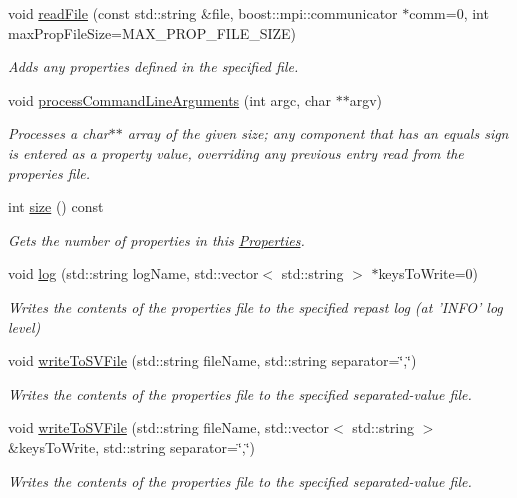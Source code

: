 \begin{DoxyCompactItemize}
void \hyperlink{classrepast_1_1_properties_a85536ec978c9077c3447bcc4a9422608}{read\-File} (const std\-::string \&file, boost\-::mpi\-::communicator $\ast$comm=0, int max\-Prop\-File\-Size=M\-A\-X\-\_\-\-P\-R\-O\-P\-\_\-\-F\-I\-L\-E\-\_\-\-S\-I\-Z\-E)
\begin{DoxyCompactList}\small\item\em Adds any properties defined in the specified file. \end{DoxyCompactList}\item 
void \hyperlink{classrepast_1_1_properties_a8fb65d329a032b1c21c77e60d9a54a85}{process\-Command\-Line\-Arguments} (int argc, char $\ast$$\ast$argv)
\begin{DoxyCompactList}\small\item\em Processes a char$\ast$$\ast$ array of the given size; any component that has an equals sign is entered as a property value, overriding any previous entry read from the properies file. \end{DoxyCompactList}\item 
int \hyperlink{classrepast_1_1_properties_afa2c5157a67086937da071b2ecbc6f86}{size} () const 
\begin{DoxyCompactList}\small\item\em Gets the number of properties in this \hyperlink{classrepast_1_1_properties}{Properties}. \end{DoxyCompactList}\item 
void \hyperlink{classrepast_1_1_properties_ae0ad23f9e0ac85943969847fb4372f9d}{log} (std\-::string log\-Name, std\-::vector$<$ std\-::string $>$ $\ast$keys\-To\-Write=0)
\begin{DoxyCompactList}\small\item\em Writes the contents of the properties file to the specified repast log (at 'I\-N\-F\-O' log level) \end{DoxyCompactList}\item 
void \hyperlink{classrepast_1_1_properties_a82b48502a6403ad5c929ae30d0470c9d}{write\-To\-S\-V\-File} (std\-::string file\-Name, std\-::string separator=\char`\"{},\char`\"{})
\begin{DoxyCompactList}\small\item\em Writes the contents of the properties file to the specified separated-\/value file. \end{DoxyCompactList}\item 
void \hyperlink{classrepast_1_1_properties_ad7f85154fb7f657e5bfaee197fc391c4}{write\-To\-S\-V\-File} (std\-::string file\-Name, std\-::vector$<$ std\-::string $>$ \&keys\-To\-Write, std\-::string separator=\char`\"{},\char`\"{})
\begin{DoxyCompactList}\small\item\em Writes the contents of the properties file to the specified separated-\/value file. \end{DoxyCompactList}\end{DoxyCompactItemize}


